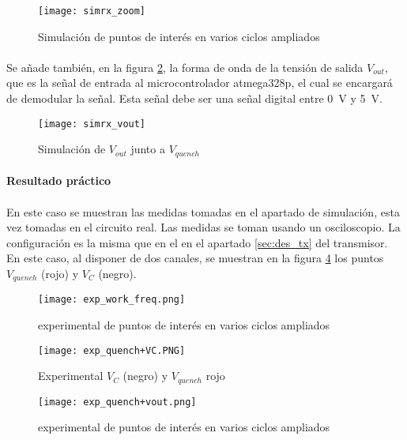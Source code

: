 \begin{figure}[h!]
    \centering
    \texttt{[image: simrx\_zoom]}
    \caption{Simulación de puntos de interés en varios ciclos ampliados}
    \label{fig:simrx_zoom}
\end{figure}

\paragraph{}
Se añade también, en la figura \ref{fig:simrx_vout}, la forma de onda de la tensión de salida $V_{out}$, que es la señal de entrada al microcontrolador atmega328p, el cual se encargará de demodular la señal. Esta señal debe ser una señal digital entre \SI{0}{\volt} y \SI{5}{\volt}.
\begin{figure}[h!]
    \centering
    \texttt{[image: simrx\_vout]}
    \caption{Simulación de $V_{out}$ junto a $V_{quench}$}
    \label{fig:simrx_vout}
\end{figure}

\paragraph{Resultado práctico} 
\paragraph{}
En este caso se muestran las medidas tomadas en el apartado de simulaci\'on, esta vez tomadas en el circuito real. Las medidas se toman usando un osciloscopio. 
La configuración es la misma que en el en el apartado \ref{sec:des_tx} del transmisor. En este caso, al disponer de dos canales, se muestran en la figura \ref{fig:exp_vc_vquench} los puntos $V_{quench}$ (rojo) y $V_{C}$ (negro).

\begin{figure}[h!]
    \centering
    \texttt{[image: exp\_work\_freq.png]}
    \caption{experimental de puntos de interés en varios ciclos ampliados}
    \label{fig:simrx_zoom}
\end{figure}
\begin{figure}[h!]
    \centering
    \texttt{[image: exp\_quench+VC.PNG]}
    \caption{Experimental $V_C$ (negro) y $V_{quench}$ rojo}
    \label{fig:exp_vc_vquench}
\end{figure}
\begin{figure}[h!]
    \centering
    \texttt{[image: exp\_quench+vout.png]}
    \caption{experimental de puntos de interés en varios ciclos ampliados}
    \label{fig:simrx_zoom}
\end{figure}

